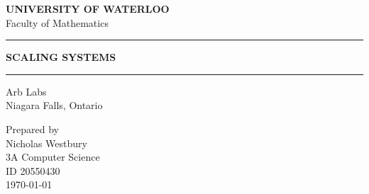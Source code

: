 \documentclass[12pt]{report}
\newcommand{\HRule}[1]{\rule{\linewidth}{#1}}
\begin{document}
\begin{titlepage}
   \begin{center}
    	\normalsize \textbf{\uppercase{University of Waterloo}} \\
		Faculty of Mathematics \\
	\end{center}	
	\begin{center}
		\HRule{0.5pt}
   		\LARGE \textbf{\uppercase{Scaling Systems}}
   		\HRule{0.5pt}
	\end{center}
	\begin{center}
	   		\normalsize {Arb Labs\\ Niagara Falls, Ontario}	
	 
	\end{center}
	\begin{center}
	   		\normalsize {Prepared by\\
				Nicholas Westbury\\
				3A Computer Science\\
				ID 20550430\\
	   		 	\today
	   		 }
	\end{center}
\end{titlepage}
\end{document}
